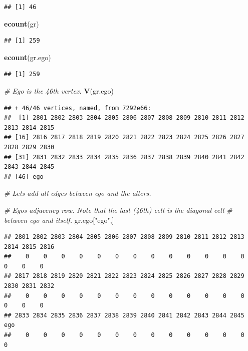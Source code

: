 \documentclass[
]{book}
\newenvironment{Shaded}{\begin{snugshade}}{\end{snugshade}}
\newcommand{\CommentTok}[1]{\textcolor[rgb]{0.56,0.35,0.01}{\textit{#1}}}
\newcommand{\FunctionTok}[1]{\textcolor[rgb]{0.13,0.29,0.53}{\textbf{#1}}}
\newcommand{\NormalTok}[1]{#1}
\newcommand{\StringTok}[1]{\textcolor[rgb]{0.31,0.60,0.02}{#1}}
\begin{document}
\begin{verbatim}
## [1] 46
\end{verbatim}

\begin{Shaded}
\begin{Highlighting}[]
\FunctionTok{ecount}\NormalTok{(gr)}
\end{Highlighting}
\end{Shaded}

\begin{verbatim}
## [1] 259
\end{verbatim}

\begin{Shaded}
\begin{Highlighting}[]
\FunctionTok{ecount}\NormalTok{(gr.ego)}
\end{Highlighting}
\end{Shaded}

\begin{verbatim}
## [1] 259
\end{verbatim}

\begin{Shaded}
\begin{Highlighting}[]
\CommentTok{\# Ego is the 46th vertex.}
\FunctionTok{V}\NormalTok{(gr.ego)}
\end{Highlighting}
\end{Shaded}

\begin{verbatim}
## + 46/46 vertices, named, from 7292e66:
##  [1] 2801 2802 2803 2804 2805 2806 2807 2808 2809 2810 2811 2812 2813 2814 2815
## [16] 2816 2817 2818 2819 2820 2821 2822 2823 2824 2825 2826 2827 2828 2829 2830
## [31] 2831 2832 2833 2834 2835 2836 2837 2838 2839 2840 2841 2842 2843 2844 2845
## [46] ego
\end{verbatim}

\begin{Shaded}
\begin{Highlighting}[]
\CommentTok{\# Let\textquotesingle{}s add all edges between ego and the alters.}

\CommentTok{\# Ego\textquotesingle{}s adjacency row. Note that the last (46th) cell is the diagonal cell}
\CommentTok{\# between ego and itself.}
\NormalTok{gr.ego[}\StringTok{"ego"}\NormalTok{,]}
\end{Highlighting}
\end{Shaded}

\begin{verbatim}
## 2801 2802 2803 2804 2805 2806 2807 2808 2809 2810 2811 2812 2813 2814 2815 2816 
##    0    0    0    0    0    0    0    0    0    0    0    0    0    0    0    0 
## 2817 2818 2819 2820 2821 2822 2823 2824 2825 2826 2827 2828 2829 2830 2831 2832 
##    0    0    0    0    0    0    0    0    0    0    0    0    0    0    0    0 
## 2833 2834 2835 2836 2837 2838 2839 2840 2841 2842 2843 2844 2845  ego 
##    0    0    0    0    0    0    0    0    0    0    0    0    0    0
\end{verbatim}
\end{document}
